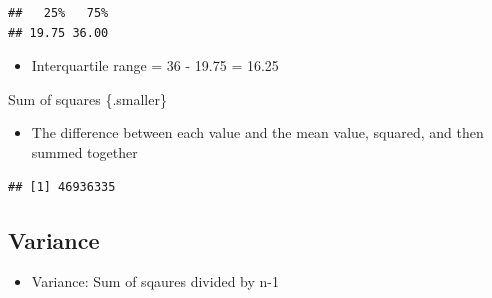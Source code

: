\documentclass[
]{book}
\newenvironment{Shaded}{\begin{snugshade}}{\end{snugshade}}
\newcommand{\CommentTok}[1]{\textcolor[rgb]{0.56,0.35,0.01}{\textit{#1}}}
\newcommand{\DataTypeTok}[1]{\textcolor[rgb]{0.13,0.29,0.53}{#1}}
\newcommand{\DecValTok}[1]{\textcolor[rgb]{0.00,0.00,0.81}{#1}}
\newcommand{\KeywordTok}[1]{\textcolor[rgb]{0.13,0.29,0.53}{\textbf{#1}}}
\newcommand{\NormalTok}[1]{#1}
\newcommand{\OperatorTok}[1]{\textcolor[rgb]{0.81,0.36,0.00}{\textbf{#1}}}
\newcommand{\StringTok}[1]{\textcolor[rgb]{0.31,0.60,0.02}{#1}}
\providecommand{\tightlist}{%
  \setlength{\itemsep}{0pt}\setlength{\parskip}{0pt}}
\begin{document}
\begin{Shaded}
\end{Shaded}

\begin{verbatim}
##   25%   75% 
## 19.75 36.00
\end{verbatim}

\begin{itemize}
\tightlist
\item
  Interquartile range = 36 - 19.75 = 16.25
\end{itemize}

Sum of squares \{.smaller\}

\begin{itemize}
\tightlist
\item
  The difference between each value and the mean value, squared, and then summed together
\end{itemize}

\begin{Shaded}
\end{Shaded}

\begin{verbatim}
## [1] 46936335
\end{verbatim}

\hypertarget{variance}{%
\subsection{Variance}\label{variance}}

\begin{itemize}
\tightlist
\item
  Variance: Sum of sqaures divided by n-1
\end{itemize}

\begin{Shaded}
\end{Shaded}
\end{document}
